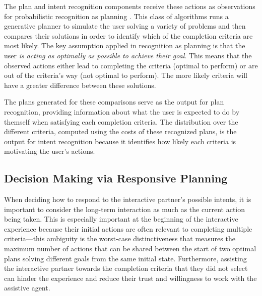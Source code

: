 \documentclass[letterpaper]{article} %
\begin{document}
The plan and intent recognition components receive these actions as observations for probabilistic recognition as planning \cite{DBLP:conf/aaai/RamirezG10}.  This class of algorithms runs a generative planner to simulate the user solving a variety of problems and then compares their solutions in order to identify which of the completion criteria are most likely.  The key assumption applied in recognition as planning is that the user \textit{is acting as optimally as possible to achieve their goal}.  This means that %
the observed actions either lead to completing the criteria (optimal to perform) or are out of the criteria's way (not optimal to perform).  The more likely criteria will have a greater difference between these solutions. %

The plans generated for these comparisons serve as the output for plan recognition, providing information about what the user is expected to do by themself when satisfying each completion criteria.  The distribution over the different criteria, computed using the costs of these recognized plans, is the output for intent recognition because it identifies how likely each criteria is motivating the user's actions.

\subsection{Decision Making via Responsive Planning\label{sec:pretcil.dec_making}}
When deciding how to respond to the interactive partner's possible intents, it is important to consider the long-term interaction as much as the current action being taken.  This is especially important at the beginning of the interactive experience because their initial actions are often relevant to completing multiple criteria---this ambiguity is the worst-case distinctiveness \cite{keren_ICAPS147814} that measures the maximum number of actions that can be shared between the start of two optimal plans solving different goals from the same initial state.  
Furthermore, assisting the interactive partner towards the completion criteria that they did not select can hinder the experience and reduce their trust and willingness to work with the assistive agent.
\end{document}
